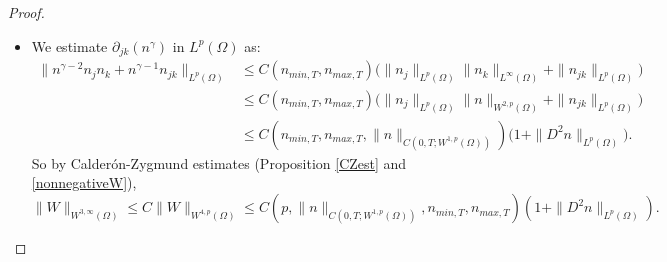 \documentclass[10pt,a4paper]{amsart}
\begin{document}
\begin{proof}
\begin{itemize}
    \begin{align*}
    \Big|p\sum_{i = 1}^{d} &\int_{0}^{t} \int_{\Omega} nn_{jk}^{p - 1}W_{iijk}\Big| \\ &\le C_{p}\left(\left|\int_{0}^{t} \int_{\Omega} nn_{jk}^{p - 1}W_{jk}\right| + \left|\int_{0}^{t} \int_{\Omega} n^{\gamma - 1} n_{j}n_{k} n_{jk}^{p - 1}\right| + \left|\int_{0}^{t} \int_{\Omega} n^{\gamma}n_{jk}^{p}\right|\right) \\
    &\le C_{p}\left(\int_{0}^{t} \int_{\Omega} \Big(n^{p}|W_{jk}|^{p} + n^{(\gamma - 1)p} |\nabla n|^{2p}\Big) + \int_{0}^{t} \int_{\Omega} \Big(1 + n^{\gamma}\Big)|D^{2}n|^{p}\right) \\
    &\le C(p, n_{min, T}, n_{max, T})\left(\int_{0}^{t} \Big(\|W\|^{p}_{W^{2, p}(\Omega)} + \|\nabla n\|_{L^{\infty}(\Omega)}^{p} \|\nabla n\|_{L^{p}(\Omega)}^{p}\Big) + \int_{0}^{t} \int_{\Omega} |D^{2}n|^{p}\right) \\
    &\le C(p, \|n\|_{C(0, T; W^{1, p}(\Omega))}, n_{min, T}, n_{max, T}) \int_{0}^{t} \int_{\Omega}\Big(1 + |D^{2}n|^{p}\Big),
    \end{align*}
    using $p > d$ along with the Sobolev embedding $W^{2, p}(\Omega) \subset W^{1, \infty}(\Omega)$ to estimate $\|\nabla n\|_{L^{\infty}(\Omega)}$ and the assumption that $W \in C(0, T; W^{3, p}(\Omega)) \subset C(0, T; W^{2, \infty}(\Omega))$. Note that by Calder\'{o}n-Zygmund estimates (Proposition \ref{CZest} and \ref{nonnegativeW}), $\|W\|_{C(0, T; W^{2, p}(\Omega))} \le C_{p}\|n\|_{C(0, T; L^{p}(\Omega))}$.
    \item We estimate $\partial_{jk}(n^{\gamma})$ in $L^{p}(\Omega)$ as:
    \begin{align*}
    \|n^{\gamma - 2} n_{j}n_{k} + n^{\gamma - 1} n_{jk}\|_{L^{p}(\Omega)} &\le C(n_{min, T}, n_{max, T}) \Big(\|n_{j}\|_{L^{p}(\Omega)} \|n_{k}\|_{L^{\infty}(\Omega)} + \|n_{jk}\|_{L^{p}(\Omega)}\Big) \\
    &\le C(n_{min, T}, n_{max, T}) \Big(\|n_{j}\|_{L^{p}(\Omega)} \|n\|_{W^{2, p}(\Omega)} + \|n_{jk}\|_{L^{p}(\Omega)}\Big) \\
    &\le C(n_{min, T}, n_{max, T}, \|n\|_{C(0, T; W^{1, p}(\Omega))}) \Big(1 + \|D^{2}n\|_{L^{p}(\Omega)}\Big).
    \end{align*}
    So by Calder\'{o}n-Zygmund estimates (Proposition \ref{CZest} and \ref{nonnegativeW}),
    \begin{equation*}
    \|W\|_{W^{3, \infty}(\Omega)} \le C\|W\|_{W^{4, p}(\Omega)} \le C(p, \|n\|_{C(0, T; W^{1, p}(\Omega))}, n_{min, T}, n_{max, T}) \left(1 + \|D^{2}n\|_{L^{p}(\Omega)}\right).

\end{equation*}
\end{itemize}
\end{proof}
\end{document}
